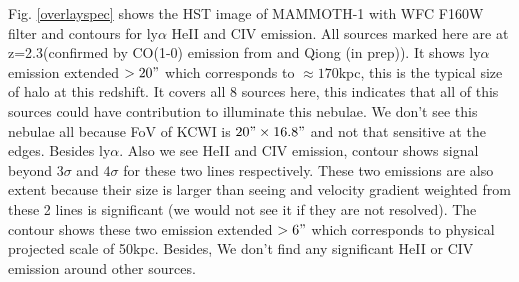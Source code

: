 \documentclass[../Results.tex]{subfiles}
\begin{document}
	Fig. \ref{overlayspec} shows the HST image of MAMMOTH-1 with WFC F160W filter and contours for ly$\alpha$ HeII and CIV emission. All sources marked here are at z=2.3(confirmed by CO(1-0) emission from \cite{emonts2019cold} and Qiong (in prep)). It shows ly$\alpha$ emission extended $>20"$ which corresponds to $\approx170$kpc, this is the typical size of halo at this redshift. It covers all 8 sources here, this indicates that all of this sources could have contribution to illuminate this nebulae. We don't see this nebulae all because FoV of KCWI is $20" \times 16.8"$ and not that sensitive at the edges. Besides ly$\alpha$. Also we see HeII and CIV emission, contour shows signal beyond $3\sigma$ and $4\sigma$ for these two lines respectively. These two emissions are also extent because their size is larger than seeing and velocity gradient weighted from these 2 lines is significant (we would not see it if they are not resolved). The contour shows these two emission extended $> 6"$ which corresponds to physical projected scale of 50kpc. Besides, We don't find any significant HeII or CIV emission around other sources. 
	
\end{document}
